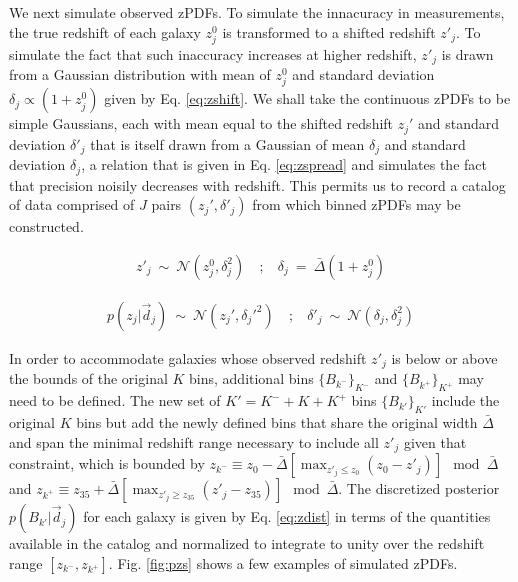 \documentclass[preprint]{aastex}
\begin{document}

We next simulate observed zPDFs.  To simulate the innacuracy in measurements, the true redshift of each galaxy $z_{j}^{0}$ is transformed to a shifted redshift $z'_{j}$.  To simulate the fact that such inaccuracy increases at higher redshift, $z'_{j}$ is drawn from a Gaussian distribution with mean of $z_{j}^{0}$ and standard deviation $\delta_{j}\propto(1+z_{j}^{0})$ given by Eq. \ref{eq:zshift}.  We shall take the continuous zPDFs to be simple Gaussians, each with mean equal to the shifted redshift $z_{j}'$ and standard deviation $\delta'_{j}$ that is itself drawn from a Gaussian of mean $\delta_{j}$ and standard deviation $\delta_{j}$, a relation that is given in Eq. \ref{eq:zspread} and simulates the fact that precision noisily decreases with redshift.  This permits us to record a catalog of data comprised of $J$ pairs $(z_{j}',\delta'_{j})$ from which binned zPDFs may be constructed.  

\begin{eqnarray}
\label{eq:zshift}
z'_{j}\ \sim\ \mathcal{N}(z_{j}^{0},\delta_{j}^{2})\ &;&\ \delta_{j}\ =\ \bar{\Delta}(1+z^{0}_{j})
\end{eqnarray}

\begin{eqnarray}
\label{eq:zspread}
p(z_{j}|\vec{d}_{j})\ \sim\ \mathcal{N}(z_{j}',\delta_{j}'^{2})\ &;&\ \delta'_{j}\ \sim\ \mathcal{N}(\delta_{j},\delta_{j}^{2})
\end{eqnarray}


In order to accommodate galaxies whose observed redshift $z'_{j}$ is below or above the bounds of the original $K$ bins, additional bins $\{B_{k^{-}}\}_{K^{-}}$ and $\{B_{k^{+}}\}_{K^{+}}$ may need to be defined.  The new set of $K'=K^{-}+K+K^{+}$ bins $\{B_{k'}\}_{K'}$ include the original $K$ bins but add the newly defined bins that share the original width $\bar{\Delta}$ and span the minimal redshift range necessary to include all $z'_{j}$ given that constraint, which is bounded by $z_{k^{-}}\equiv z_{0}-\bar{\Delta}[\max_{z'_{j}\leq z_{0}}(z_{0}-z'_{j})]\mod\bar{\Delta}$ and $z_{k^{+}}\equiv z_{35}+\bar{\Delta}[\max_{z'_{j}\geq z_{35}}(z'_{j}-z_{35})]\mod\bar{\Delta}$.  The discretized posterior $p(B_{k'}|\vec{d}_{j})$ for each galaxy is given by Eq. \ref{eq:zdist} in terms of the quantities available in the catalog and normalized to integrate to unity over the redshift range $[z_{k^{-}},z_{k^{+}}]$.  Fig. \ref{fig:pzs} shows a few examples of simulated zPDFs.
\end{document}
